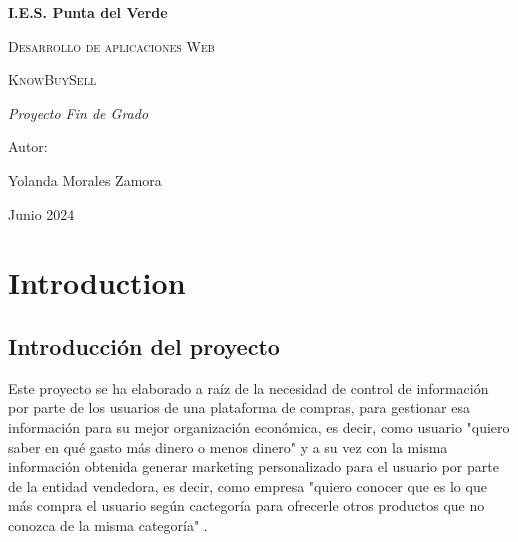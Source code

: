 \documentclass{article}
\begin{document}
\begin{titlepage}
\centering
{\bfseries\LARGE I.E.S. Punta del Verde \par}
\vspace{1cm}
{\scshape\Large Desarrollo de aplicaciones Web \par}
\vspace{3cm}
{\scshape\Huge  KnowBuySell \par}
\vspace{3cm}
{\itshape\Large Proyecto Fin de Grado \par}
\vfill
{\Large Autor: \par}
{\Large Yolanda Morales Zamora \par}
\vfill
{\Large Junio 2024 \par}
\end{titlepage}




\section{Introduction}

\subsection{Introducción del proyecto}
Este proyecto se ha elaborado a raíz de la necesidad de control de información por parte de los usuarios de una plataforma de compras, para gestionar esa información para su mejor organización económica, es decir, como usuario "quiero saber en qué gasto más dinero o menos dinero" y a su vez con la misma información obtenida generar marketing personalizado para el usuario por parte de la entidad vendedora, es decir, como empresa "quiero conocer que es lo que más compra el usuario según cactegoría para ofrecerle otros productos que no conozca de la misma categoría" .\\
\end{document}

